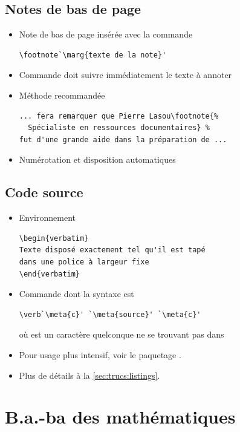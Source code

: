 \subsection{Notes de bas de page}

\begin{itemize}
\item Note de bas de page insérée avec la commande
\begin{lstlisting}
\footnote`\marg{texte de la note}'
\end{lstlisting}
\item Commande doit suivre immédiatement le texte à annoter
\item Méthode recommandée
\begin{lstlisting}[emph=footnote]
... fera remarquer que Pierre Lasou\footnote{%
  Spécialiste en ressources documentaires} %
fut d'une grande aide dans la préparation de ...
\end{lstlisting}
\item Numérotation et disposition automatiques
\end{itemize}

\subsection{Code source}

\begin{itemize}
\item Environnement 
\begin{lstlisting}
\begin{verbatim}
Texte disposé exactement tel qu'il est tapé
dans une police à largeur fixe
\end{verbatim}
\end{lstlisting}
\item Commande \cmd{\verb} dont la syntaxe est
\begin{lstlisting}
\verb`\meta{c}' `\meta{source}' `\meta{c}'
\end{lstlisting}
  où  est un caractère quelconque ne se trouvant pas dans
\item Pour usage plus intensif, voir le paquetage .
\item Plus de détails à la \autoref{sec:trucs:listings}.
\end{itemize}


\section{B.a.-ba des mathématiques}

